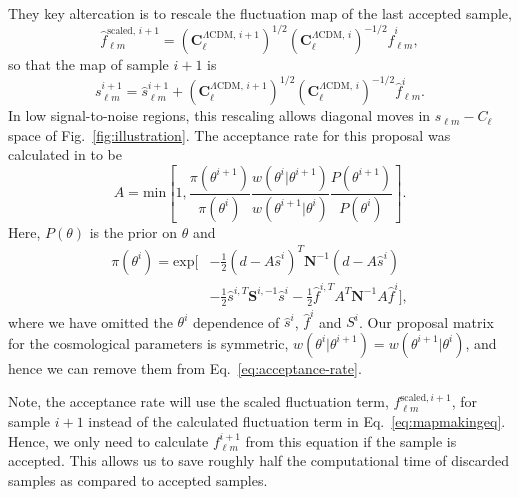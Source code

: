 \documentclass[twocolumn]{../common/aa}
\begin{document}
They key altercation is to rescale the fluctuation map of the last accepted sample,
\begin{equation}
    \hat{f}_{\ell m}^{\textrm{scaled},\, i+1} = \left(\textbf{C}^{\Lambda\mathrm{CDM},\,i+1}_{\ell}\right)^{1/2}\left(\textbf{C}^{\Lambda\mathrm{CDM},\,i}_{\ell}\right)^{-1/2} \hat{f}_{\ell m}^{i},
\end{equation}
so that the map of sample $i+1$ is
\begin{equation}
    s_{\ell m}^{i+1} = \hat{s}_{\ell m}^{i+1} + \left(\textbf{C}^{\Lambda\mathrm{CDM},\,i+1}_{\ell}\right)^{1/2}\left(\textbf{C}^{\Lambda\mathrm{CDM},\,i}_{\ell}\right)^{-1/2} \hat{f}_{\ell m}^{i}.
\end{equation}
In low signal-to-noise regions, this rescaling allows diagonal moves in $s_{\ell m} - C_\ell$ space of Fig.~\ref{fig:illustration}. The acceptance rate for this proposal was calculated in \cite{racine:2016} to be
\begin{equation}
    \label{eq:acceptance-rate}
    A = \mathrm{min}\left[1, \frac{\pi(\theta^{i+1})}{\pi(\theta^i)} \frac{w(\theta^{i} |\theta^{i+1})}{w(\theta^{i+1} |\theta^i) }\frac{P(\theta^{i+1})}{P(\theta^i)} \right].
\end{equation}
Here, $P(\theta)$ is the prior on $\theta$ and
\begin{align}
    \nonumber
    \pi(\theta^{i}) = \mathrm{exp}\bigg[&-\frac12 \left(d-A\hat{s}^i\right)^T \textbf{N}^{-1}\left(d-A\hat{s}^i\right)\\
    &-\frac12 \hat{s}^{i,T} \textbf{S}^{i, -1}\hat{s}^i -\frac12 \hat{f}^{i, T}A^T\textbf{N}^{-1} A\hat{f}^i\bigg],
\end{align}
where we have omitted the $\theta^i$ dependence of $\hat{s}^i$, $\hat{f}^i$ and $S^i$. Our proposal matrix for the cosmological parameters is symmetric, $w(\theta^{i} |\theta^{i+1}) = w(\theta^{i+1} |\theta^{i})$, and hence we can remove them from Eq.~\eqref{eq:acceptance-rate}.

Note, the acceptance rate will use the scaled fluctuation term, $f_{\ell m}^{\textrm{scaled}, i+1}$, for sample $i+1$ instead of the calculated fluctuation term in Eq.~\eqref{eq:mapmakingeq}. Hence, we only need to calculate $f_{\ell m}^{i+1}$ from this equation if the sample is accepted. This allows us to save roughly half the computational time of discarded samples as compared to accepted samples.
\end{document}
